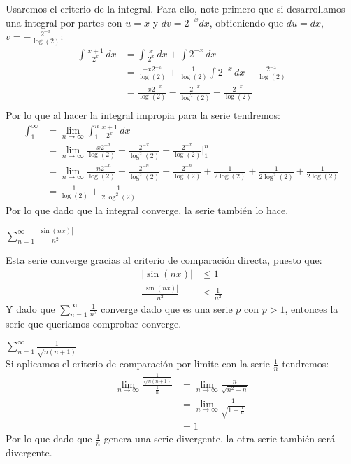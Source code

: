 \documentclass[../main.tex]{subfiles}
\begin{document}
Usaremos el criterio de la integral. Para ello, note primero que si desarrollamos una integral por partes con $u = x$ y $dv = 2^{-x} dx$, obtieniendo que $du = dx$, $v = -\frac{2^{-x}}{\log(2)}$:
\begin{align*}
    \int \frac{x+1}{2^x} \, dx &= \int \frac{x}{2^x} \,dx + \int 2^{-x} \, dx\\
    &= \frac{-x2^{-x}}{\log(2)} + \frac{1}{\log(2)} \int 2^{-x} \,dx - \frac{2^{-x}}{\log(2)}\\
    &= \frac{-x2^{-x}}{\log(2)} - \frac{2^{-x}}{\log^2(2)} - \frac{2^{-x}}{\log(2)}\\
\end{align*}
Por lo que al hacer la integral impropia para la serie tendremos:
\begin{align*}
    \int_{1}^\infty &= \lim_{n \to \infty} \int_{1}^n \frac{x+1}{2^x} \,dx\\
    &= \lim_{n \to \infty} \frac{-x2^{-x}}{\log(2)} - \frac{2^{-x}}{\log^2(2)} - \frac{2^{-x}}{\log(2)} |_{1}^n\\
    &= \lim_{n \to \infty}\frac{-n2^{-n}}{\log(2)} - \frac{2^{-n}}{\log^2(2)} - \frac{2^{-n}}{\log(2)} + \frac{1}{2\log(2)} + \frac{1}{2\log^2(2)} + \frac{1}{2\log(2)}\\
    &= \frac{1}{\log(2)} + \frac{1}{2\log^2(2)}
\end{align*}
Por lo que dado que la integral converge, la serie también lo hace.

\question $\sum\limits_{n = 1}^\infty \frac{|\sin(nx)|}{n^2}$

Esta serie converge gracias al criterio de comparación directa, puesto que:
\begin{align*}
    |\sin(nx)| &\le 1\\
    \frac{|\sin(nx)|}{n^2} &\le \frac{1}{n^2}
\end{align*}
Y dado que $\sum\limits_{n = 1}^\infty \frac{1}{n^2}$ converge dado que es una serie $p$ con $p > 1$, entonces la serie que queriamos comprobar converge.

\question $\sum\limits_{n = 1}^\infty \frac{1}{\sqrt{n(n+1)}}$\\

Si aplicamos el criterio de comparación por limite con la serie $\frac{1}{n}$ tendremos:
\begin{align*}
    \lim_{n \to \infty} \frac{\frac{1}{\sqrt{n(n+1)}}}{\frac{1}{n}} &= \lim_{n \to \infty} \frac{n}{\sqrt{n^2 + n}}\\
    &= \lim_{n \to \infty} \frac{1}{\sqrt{1 + \frac{1}{n}}}\\
    &= 1
\end{align*}
Por lo que dado que $\frac{1}{n}$ genera una serie divergente, la otra serie también será divergente.
\end{document}
